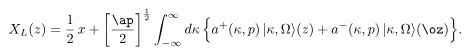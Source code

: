 \begin{equation*}
X_L(z)=
\frac{1}{2}\,x+\left[\frac{\ap}{2}\right]^{\frac12}
\int_{-\infty}^{\infty}d\kappa\,
\Bigl\{a^+(\kappa,p)\,|\kappa,\Omega\rangle(z)+
a^-(\kappa,p)\,|\kappa,\Omega\rangle(\oz)\Bigr\}.
\end{equation*}

